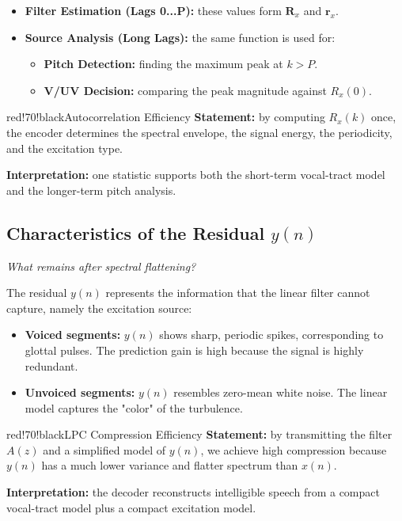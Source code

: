 \begin{itemize}
\item \textbf{Filter Estimation (Lags 0...P):} these values form $\mathbf{R}_x$ and $\mathbf{r}_x$.
\item \textbf{Source Analysis (Long Lags):} the same function is used for:
\begin{itemize}
\item \textbf{Pitch Detection:} finding the maximum peak at $k > P$.
\item \textbf{V/UV Decision:} comparing the peak magnitude against $R_x(0)$.
\end{itemize}
\end{itemize}

\begin{calloutbox}{red!70!black}{Autocorrelation Efficiency}
\textbf{Statement:} by computing $R_x(k)$ once, the encoder determines the spectral envelope, the signal energy, the periodicity, and the excitation type.

\textbf{Interpretation:} one statistic supports both the short-term vocal-tract model and the longer-term pitch analysis.
\end{calloutbox}

\subsection{Characteristics of the Residual $y(n)$}

\textit{What remains after spectral flattening?}

The residual $y(n)$ represents the information that the linear filter cannot capture, namely the excitation source:

\begin{itemize}
\item \textbf{Voiced segments:} $y(n)$ shows sharp, periodic spikes, corresponding to glottal pulses. The prediction gain is high because the signal is highly redundant.
\item \textbf{Unvoiced segments:} $y(n)$ resembles zero-mean white noise. The linear model captures the "color" of the turbulence.
\end{itemize}

\begin{calloutbox}{red!70!black}{LPC Compression Efficiency}
\textbf{Statement:} by transmitting the filter $A(z)$ and a simplified model of $y(n)$, we achieve high compression because $y(n)$ has a much lower variance and flatter spectrum than $x(n)$.

\textbf{Interpretation:} the decoder reconstructs intelligible speech from a compact vocal-tract model plus a compact excitation model.
\end{calloutbox}

